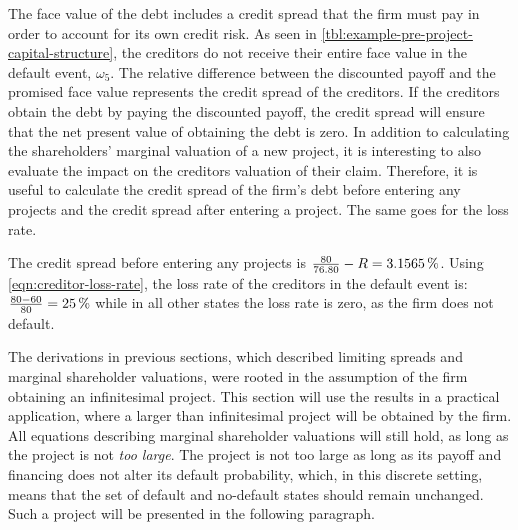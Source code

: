 \documentclass[main.tex]{subfiles}
\begin{document}
    The face value of the debt includes a credit spread that the firm must pay in order to account for its own credit risk.
    As seen in \cref{tbl:example-pre-project-capital-structure},
    the creditors do not receive their entire face value in the default event, $\omega_5$.
    The relative difference between the discounted payoff and the promised face value
    represents the credit spread of the creditors.
    If the creditors obtain the debt by paying the discounted payoff,
    the credit spread will ensure that the net present value of obtaining the debt is zero.
    In addition to calculating the shareholders' marginal valuation of a new project,
    it is interesting to also evaluate the impact on the creditors valuation of their claim. 
    Therefore, it is useful to calculate the credit spread of the firm's debt 
    before entering any projects and the credit spread after entering a project.
    The same goes for the loss rate.

    The credit spread before entering any projects is 
    $\frac{\num{80}}{\num{76.80}} - \grossrfrate = \pct{0.031565}$.
    Using \cref{eqn:creditor-loss-rate}, the loss rate of the creditors in the default event is:
    $\frac{\num{80}-\num{60}}{\num{80}} = \pct{0.25}$
    while in all other states the loss rate is zero, as the firm does not default.

    The derivations in previous sections, 
    which described limiting spreads and marginal shareholder valuations, 
    were rooted in the assumption of the firm obtaining an infinitesimal project.
    This section will use the results in a practical application,
    where a larger than infinitesimal project will be obtained by the firm.
    All equations describing marginal shareholder valuations will still hold,
    as long as the project is not \textit{too large}.
    The project is not too large as long as its payoff and financing does not 
    alter its default probability, which, in this discrete setting, means
    that the set of default and no-default states should remain unchanged.
    Such a project will be presented in the following paragraph.
    
\end{document}
